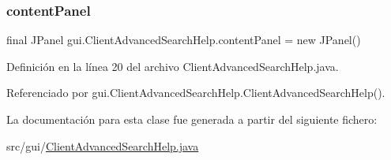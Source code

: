 \subsubsection{\texorpdfstring{contentPanel}{contentPanel}}
{\footnotesize\ttfamily final J\+Panel gui.\+Client\+Advanced\+Search\+Help.\+content\+Panel = new J\+Panel()\hspace{0.3cm}{\ttfamily [private]}}



Definición en la línea 20 del archivo Client\+Advanced\+Search\+Help.\+java.



Referenciado por gui.\+Client\+Advanced\+Search\+Help.\+Client\+Advanced\+Search\+Help().



La documentación para esta clase fue generada a partir del siguiente fichero\+:\begin{DoxyCompactItemize}
\item 
src/gui/\mbox{\hyperlink{_client_advanced_search_help_8java}{Client\+Advanced\+Search\+Help.\+java}}\end{DoxyCompactItemize}

